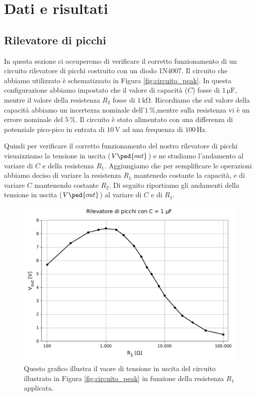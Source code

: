 \section*{Dati e risultati}

\subsection{Rilevatore di picchi}

In questa sezione ci occuperemo di verificare il corretto funzionamento di un circuito rilevatore di picchi costruito con un diodo 1N4007.
Il circuito che abbiamo utilizzato è schematizzato in Figura \ref{fig:circuito_peak}.
In questa configurazione abbiamo impostato che il valore di capacità ($C$) fosse di $1\,\si{\micro\farad}$, mentre il valore della resistenza $R_2$ fosse di $1\,\si{\kilo\ohm}$. Ricordiamo che sul valore della capacità abbiamo un incertezza nominale dell'$1\,\%$,mentre sulla resistenza vi è un errore nominale del $5\,\%$.
Il circuito è stato alimentato con una differenza di potenziale pico-pico in entrata di $10\,\si{\volt}$ ad una frequenza di $100\,\si{\hertz}$.

Quindi per verificare il corretto funzionamento del nostro rilevatore di picchi visuaizziamo la tensione in uscita ($V\ped{out}$) e ne studiamo l'andamento al variare di $C$ e della resistenza $R_1$.
Aggiungiamo che per semplificare le operazioni abbiamo deciso di variare la resistenza $R_1$ mantenedo costante la capacità, e di variare $C$ mantenendo costante $R_2$.
Di seguito riportiamo gli andamenti della tensione in uscita ($V\ped{out}$) al variare di $C$ e di $R_1$.

\begin{figure}[H]
    \includegraphics[scale=0.7]{capacita.pdf}
    \caption{Questo grafico illustra il vaore di tensione in uscita del circuito illustrato in Figura \ref{fig:circuito_peak} in funzione della resistenza $R_1$ applicata.}
    \label{fig:capacita}
\end{figure}

